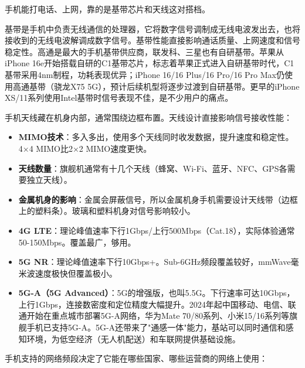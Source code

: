 
手机能打电话、上网，靠的是基带芯片和天线这对搭档。


基带是手机中负责无线通信的处理器，它将数字信号调制成无线电波发出去，也将接收到的无线电波解调成数字信号。基带性能直接影响通话质量、上网速度和信号稳定性。高通是最大的手机基带供应商，联发科、三星也有自研基带。苹果从iPhone 16e开始搭载自研的C1基带芯片，标志着苹果正式进入自研基带时代，C1基带采用4nm制程，功耗表现优异；iPhone 16/16 Plus/16 Pro/16 Pro Max仍使用高通基带（骁龙X75 5G），预计后续机型将逐步过渡到自研基带。更早的iPhone XS/11系列使用Intel基带时信号表现不佳，是不少用户的痛点。


手机天线藏在机身内部，通常围绕边框布置。天线设计直接影响信号接收性能：

\begin{itemize}
  \item \textbf{MIMO技术}：多入多出，使用多个天线同时收发数据，提升速度和稳定性。4×4 MIMO比2×2 MIMO速度更快。
  \item \textbf{天线数量}：旗舰机通常有十几个天线（蜂窝、Wi-Fi、蓝牙、NFC、GPS各需要独立天线）。
  \item \textbf{金属机身的影响}：金属会屏蔽信号，所以金属机身手机需要设计天线带（边框上的塑料条）。玻璃和塑料机身对信号影响较小。
\end{itemize}


\begin{itemize}
  \item \textbf{4G LTE}：理论峰值速率下行1Gbps/上行500Mbps（Cat.18），实际体验通常50-150Mbps。覆盖最广，够用。
  \item \textbf{5G NR}：理论峰值速率下行10Gbps+。Sub-6GHz频段覆盖较好，mmWave毫米波速度极快但覆盖极小。
  \item \textbf{5G-A（5G Advanced）}：5G的增强版，也叫5.5G。下行速率可达10Gbps，上行1Gbps，连接数密度和定位精度大幅提升。2024年起中国移动、电信、联通开始在重点城市部署5G-A网络，华为Mate 70/80系列、小米15/16系列等旗舰手机已支持5G-A。5G-A还带来了"通感一体"能力，基站可以同时通信和感知环境，为低空经济（无人机配送）和车联网提供基础设施。
\end{itemize}


手机支持的网络频段决定了它能在哪些国家、哪些运营商的网络上使用：

